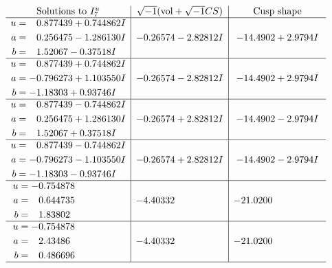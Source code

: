 \documentclass[1p]{elsarticle_modified}
\theoremstyle{definition}
\newcommand{\I}{\sqrt{-1}}
\begin{document}
$$\begin{array}{c|c|c}  
\text{Solutions to }I^u_{7}& \I (\text{vol} + \sqrt{-1}CS) & \text{Cusp shape}\\
 \hline 
\begin{aligned}
u &= \phantom{-}0.877439 + 0.744862 I \\
a &= \phantom{-}0.256475 - 1.286130 I \\
b &= \phantom{-}1.52067 - 0.37518 I\end{aligned}
 & -0.26574 - 2.82812 I & -14.4902 + 2.9794 I \\ \hline\begin{aligned}
u &= \phantom{-}0.877439 + 0.744862 I \\
a &= -0.796273 + 1.103550 I \\
b &= -1.18303 + 0.93746 I\end{aligned}
 & -0.26574 - 2.82812 I & -14.4902 + 2.9794 I \\ \hline\begin{aligned}
u &= \phantom{-}0.877439 - 0.744862 I \\
a &= \phantom{-}0.256475 + 1.286130 I \\
b &= \phantom{-}1.52067 + 0.37518 I\end{aligned}
 & -0.26574 + 2.82812 I & -14.4902 - 2.9794 I \\ \hline\begin{aligned}
u &= \phantom{-}0.877439 - 0.744862 I \\
a &= -0.796273 - 1.103550 I \\
b &= -1.18303 - 0.93746 I\end{aligned}
 & -0.26574 + 2.82812 I & -14.4902 - 2.9794 I \\ \hline\begin{aligned}
u &= -0.754878\phantom{ +0.000000I} \\
a &= \phantom{-}0.644735\phantom{ +0.000000I} \\
b &= \phantom{-}1.83802\phantom{ +0.000000I}\end{aligned}
 & -4.40332\phantom{ +0.000000I} & -21.0200\phantom{ +0.000000I} \\ \hline\begin{aligned}
u &= -0.754878\phantom{ +0.000000I} \\
a &= \phantom{-}2.43486\phantom{ +0.000000I} \\
b &= \phantom{-}0.486696\phantom{ +0.000000I}\end{aligned}
 & -4.40332\phantom{ +0.000000I} & -21.0200\phantom{ +0.000000I}\\
 \hline 
 \end{array}$$\newpage\newpage\renewcommand{\arraystretch}{1}
\end{document}
